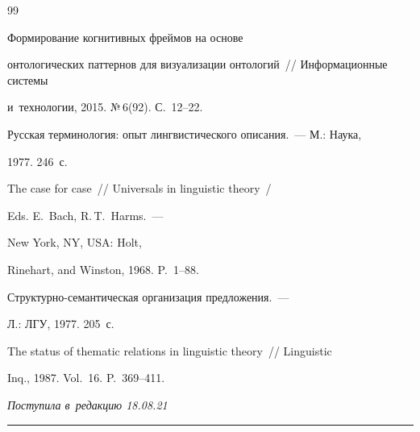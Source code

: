 {{\begin{thebibliography}{99}

 Формирование когнитивных фреймов на основе 

онтологических паттернов для визуализации онтологий~/\!\!/ Информационные сис\-те\-мы 

и~технологии, 2015. №\,6(92). С.~12--22. 


 Русская терминология: опыт лингвистического описания.~--- М.: Наука, 

1977. 246~с.


 The case for case~/\!\!/ Universals in linguistic theory~/

Eds. E.~Bach, R.\,T.~Harms.~---

 New York, NY, USA: Holt, 

Rinehart, and Winston, 1968. P.~1--88. 


 Струк\-тур\-но-се\-ман\-ти\-че\-ская организация предложения.~---

 Л.: ЛГУ, 1977. 205~с.


 The status of thematic relations in linguistic theory~/\!\!/ Linguistic 

Inq., 1987. Vol.~16. P.~369--411.

  \end{thebibliography}

} }







\vspace*{-8pt}



\hfill{\small\textit{Поступила в~редакцию 18.08.21}}



\vspace*{6pt}



\hrule



\vspace*{2pt}









